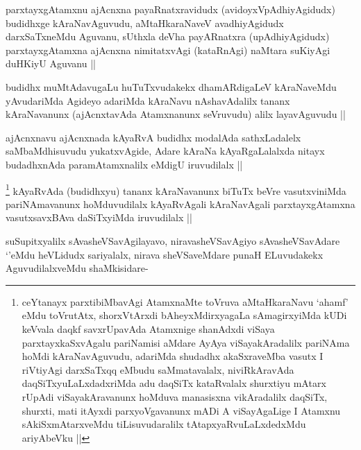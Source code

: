 
\begin{artha}
parxtayxgAtamxnu ajAcnxna payaRnatxravidudx (avidoyxVpAdhiyAgidudx) budidhxge kAraNavAguvudu, aMtaHkaraNaveV avadhiyAgidudx darxSaTxneMdu Aguvanu, sUthxla deVha payARnatxra (upAdhiyAgidudx) parxtayxgAtamxna ajAcnxna nimitatxvAgi (kataRnAgi) naMtara suKiyAgi duHKiyU Aguvanu ||
\end{artha}


\begin{artha}
budidhx muMtAdavugaLu huTuTxvudakekx dhamARdigaLeV kAraNaveMdu yAvudariMda Agideyo adariMda kAraNavu nAshavAdalilx tananx kAraNavanunx (ajAcnxtavAda Atamxnanunx seVruvudu) alilx layavAguvudu ||
\end{artha}


\begin{artha}
ajAcnxnavu ajAcnxnada kAyaRvA budidhx modalAda sathxLadalelx saMbaMdhisuvudu yukatxvAgide, Adare kAraNa kAyaRgaLalalxda nitayx budadhxnAda paramAtamxnalilx eMdigU iruvudilalx ||
\end{artha}

\begin{artha}
\footnote{ceYtanayx parxtibiMbavAgi AtamxnaMte toVruva aMtaHkaraNavu `ahamf' eMdu toVrutAtx, shorxVtArxdi bAheyxMdirxyagaLa sAmagirxyiMda kUDi keVvala daqkf savxrUpavAda Atamxnige shanAdxdi viSaya parxtayxkaSxvAgalu pariNamisi aMdare AyAya viSayakAradalilx pariNAma hoMdi kAraNavAguvudu, adariMda shudadhx akaSxraveMba vasutx I riVtiyAgi darxSaTxqq eMbudu saMmatavalalx, niviRkAravAda daqSiTxyuLaLxdadxriMda adu daqSiTx kataRvalalx shurxtiyu mAtarx rUpAdi viSayakAravanunx hoMduva manasisxna vikAradalilx daqSiTx, shurxti, mati itAyxdi parxyoVgavanunx mADi A viSayAgaLige I Atamxnu sAkiSxmAtarxveMdu tiLisuvudaralilx tAtapxyaRvuLaLxdedxMdu ariyAbeVku ||}
kAyaRvAda (budidhxyu) tananx kAraNavanunx biTuTx beVre vasutxviniMda pariNAmavanunx hoMduvudilalx kAyaRvAgali kAraNavAgali parxtayxgAtamxna vasutxsavxBAva daSiTxyiMda iruvudilalx ||
\end{artha}

\begin{artha}
suSupitxyalilx sAvasheVSavAgilayavo, niravasheVSavAgiyo sAvasheVSavAdare `\stext'eMdu heVLidudx sariyalalx, nirava sheVSaveMdare punaH ELuvudakekx AguvudilalxveMdu shaMkisidare-
\end{artha}

